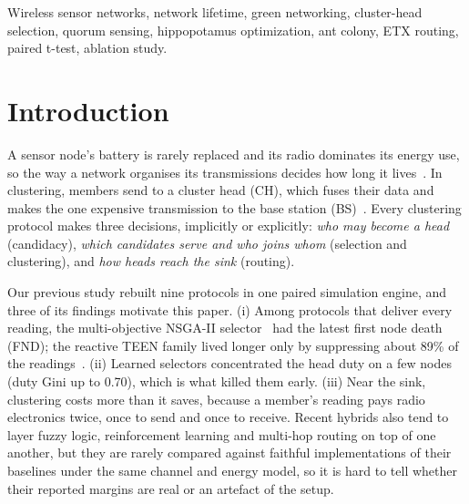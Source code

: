 \documentclass[conference]{IEEEtran}
\begin{document}
\begin{IEEEkeywords}
Wireless sensor networks, network lifetime, green networking, cluster-head selection, quorum sensing, hippopotamus optimization, ant colony, ETX routing, paired t-test, ablation study.
\end{IEEEkeywords}
\section{Introduction}
A sensor node's battery is rarely replaced and its radio dominates its energy use, so the way a network organises its transmissions decides how long it lives~\cite{heinzelman2002leachc}. In clustering, members send to a cluster head (CH), which fuses their data and makes the one expensive transmission to the base station (BS)~\cite{heinzelman2000leach}. Every clustering protocol makes three decisions, implicitly or explicitly: \emph{who may become a head} (candidacy), \emph{which candidates serve and who joins whom} (selection and clustering), and \emph{how heads reach the sink} (routing).

Our previous study rebuilt nine protocols in one paired simulation engine, and three of its findings motivate this paper. (i) Among protocols that deliver every reading, the multi-objective NSGA-II selector~\cite{deb2002nsga2} had the latest first node death (FND); the reactive TEEN family lived longer only by suppressing about 89\% of the readings~\cite{manjeshwar2001teen}. (ii) Learned selectors concentrated the head duty on a few nodes (duty Gini up to 0.70), which is what killed them early. (iii) Near the sink, clustering costs more than it saves, because a member's reading pays radio electronics twice, once to send and once to receive. Recent hybrids also tend to layer fuzzy logic, reinforcement learning and multi-hop routing on top of one another, but they are rarely compared against faithful implementations of their baselines under the same channel and energy model, so it is hard to tell whether their reported margins are real or an artefact of the setup.
\end{document}
